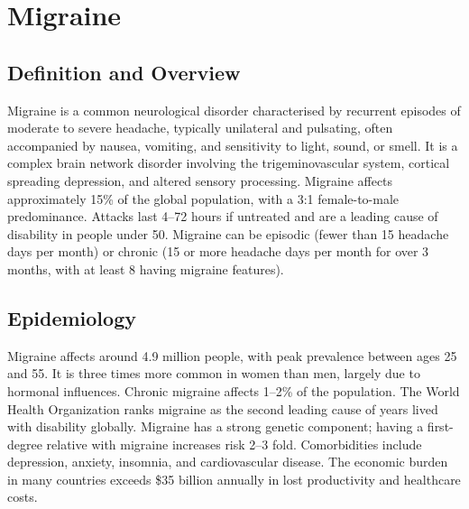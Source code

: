 \chapter{Migraine}

\section*{Definition and Overview}
Migraine is a common neurological disorder characterised by recurrent episodes of moderate to severe headache, typically unilateral and pulsating, often accompanied by nausea, vomiting, and sensitivity to light, sound, or smell. It is a complex brain network disorder involving the trigeminovascular system, cortical spreading depression, and altered sensory processing. Migraine affects approximately 15\% of the global population, with a 3:1 female-to-male predominance. Attacks last 4--72 hours if untreated and are a leading cause of disability in people under 50. Migraine can be episodic (fewer than 15 headache days per month) or chronic (15 or more headache days per month for over 3 months, with at least 8 having migraine features).

\section*{Epidemiology}
Migraine affects around 4.9 million people, with peak prevalence between ages 25 and 55. It is three times more common in women than men, largely due to hormonal influences. Chronic migraine affects 1--2\% of the population. The World Health Organization ranks migraine as the second leading cause of years lived with disability globally. Migraine has a strong genetic component; having a first-degree relative with migraine increases risk 2--3 fold. Comorbidities include depression, anxiety, insomnia, and cardiovascular disease. The economic burden in many countries exceeds \$35 billion annually in lost productivity and healthcare costs.

